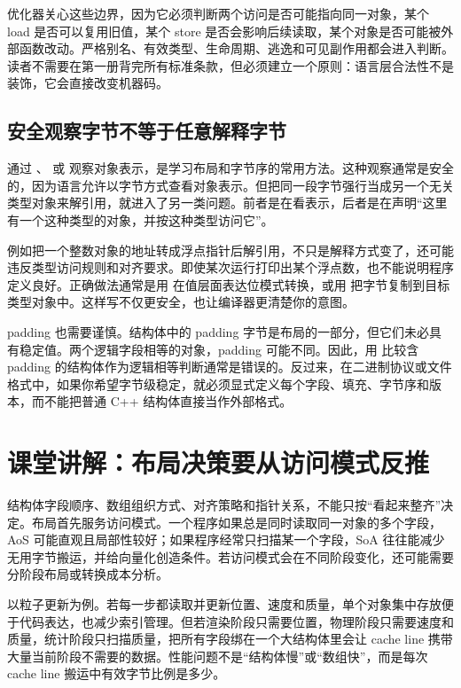 优化器关心这些边界，因为它必须判断两个访问是否可能指向同一对象，某个 load 是否可以复用旧值，某个 store 是否会影响后续读取，某个对象是否可能被外部函数改动。严格别名、有效类型、生命周期、逃逸和可见副作用都会进入判断。读者不需要在第一册背完所有标准条款，但必须建立一个原则：语言层合法性不是装饰，它会直接改变机器码。

\subsection{安全观察字节不等于任意解释字节}

通过 、 或  观察对象表示，是学习布局和字节序的常用方法。这种观察通常是安全的，因为语言允许以字节方式查看对象表示。但把同一段字节强行当成另一个无关类型对象来解引用，就进入了另一类问题。前者是在看表示，后者是在声明“这里有一个这种类型的对象，并按这种类型访问它”。

例如把一个整数对象的地址转成浮点指针后解引用，不只是解释方式变了，还可能违反类型访问规则和对齐要求。即使某次运行打印出某个浮点数，也不能说明程序定义良好。正确做法通常是用  在值层面表达位模式转换，或用  把字节复制到目标类型对象中。这样写不仅更安全，也让编译器更清楚你的意图。

padding 也需要谨慎。结构体中的 padding 字节是布局的一部分，但它们未必具有稳定值。两个逻辑字段相等的对象，padding 可能不同。因此，用  比较含 padding 的结构体作为逻辑相等判断通常是错误的。反过来，在二进制协议或文件格式中，如果你希望字节级稳定，就必须显式定义每个字段、填充、字节序和版本，而不能把普通 C++ 结构体直接当作外部格式。

\section{课堂讲解：布局决策要从访问模式反推}

结构体字段顺序、数组组织方式、对齐策略和指针关系，不能只按“看起来整齐”决定。布局首先服务访问模式。一个程序如果总是同时读取同一对象的多个字段，AoS 可能直观且局部性较好；如果程序经常只扫描某一个字段，SoA 往往能减少无用字节搬运，并给向量化创造条件。若访问模式会在不同阶段变化，还可能需要分阶段布局或转换成本分析。

以粒子更新为例。若每一步都读取并更新位置、速度和质量，单个对象集中存放便于代码表达，也减少索引管理。但若渲染阶段只需要位置，物理阶段只需要速度和质量，统计阶段只扫描质量，把所有字段绑在一个大结构体里会让 cache line 携带大量当前阶段不需要的数据。性能问题不是“结构体慢”或“数组快”，而是每次 cache line 搬运中有效字节比例是多少。

